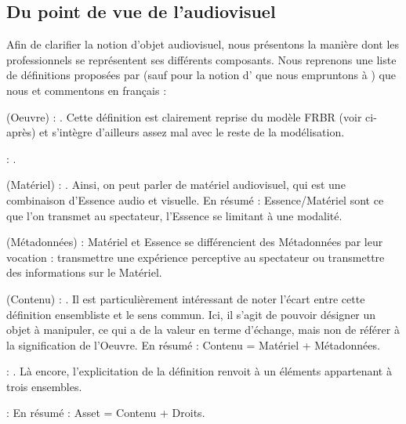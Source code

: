 \subsection{Du point de vue de l'audiovisuel}\label{sec:pv-av}
Afin de clarifier la notion d'objet audiovisuel, nous présentons la manière dont les professionnels se représentent ses différents composants.
Nous reprenons une liste de définitions proposées par \cite[p.77]{Cox2006} (sauf pour la notion d' que nous empruntons à \cite{Austerberry2004}) que nous  et commentons en français : 
\begin{liste}
	\item {} (Oeuvre) : .
	Cette définition est clairement reprise du modèle FRBR (voir ci-après) et s'intègre d'ailleurs assez mal avec le reste de la modélisation.

	\item {} : .

	\item {} (Matériel) : . 
	Ainsi, on peut parler de matériel audiovisuel, qui est une combinaison d'Essence audio et visuelle.
	En résumé : Essence/Matériel sont ce que l'on transmet au spectateur, l'Essence se limitant à une modalité.

	\item {} (Métadonnées) : 
	Matériel et Essence se différencient des Métadonnées par leur vocation : transmettre une expérience perceptive au spectateur ou transmettre des informations sur le Matériel.

	\item {} (Contenu) : . 
	Il est particulièrement intéressant de noter l'écart entre cette définition ensembliste et le sens commun. 
	Ici, il s'agit de pouvoir désigner un objet à manipuler, ce qui a de la valeur en terme d'échange, mais non de référer à la signification de l'Oeuvre.
	En résumé : Contenu = Matériel + Métadonnées.

	\item {} : .
	Là encore, l'explicitation de la définition renvoit à un éléments appartenant à trois ensembles. 

	\item {} :  
	En résumé : Asset = Contenu + Droits.
\end{liste}

